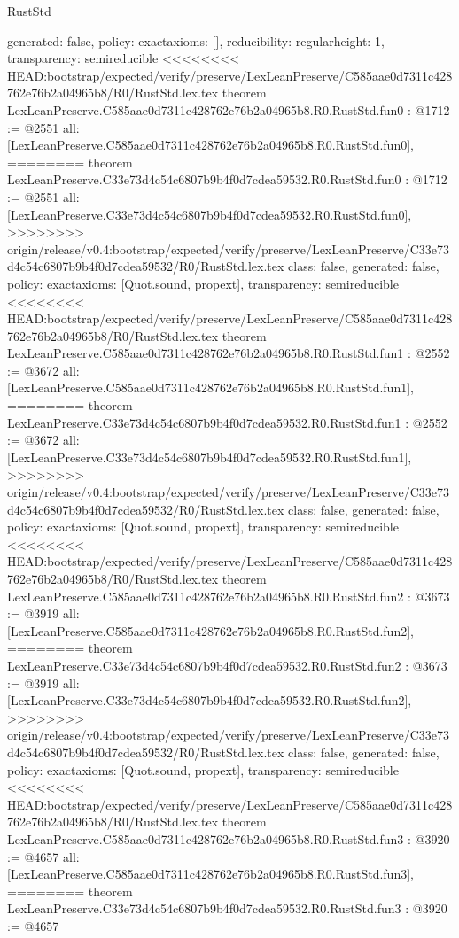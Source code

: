 \begin{lexlean}{RustStd}
\begin{coremodule}
{\begin{coremodule}
{{{  generated: false,
  policy: exact{axioms: []},
  reducibility: regular{height: 1},
  transparency: semireducible
}
<<<<<<<< HEAD:bootstrap/expected/verify/preserve/LexLeanPreserve/C585aae0d7311c428762e76b2a04965b8/R0/RustStd.lex.tex
theorem LexLeanPreserve.C585aae0d7311c428762e76b2a04965b8.R0.RustStd.fun0 : @1712 := @2551 {
  all: [LexLeanPreserve.C585aae0d7311c428762e76b2a04965b8.R0.RustStd.fun0],
========
theorem LexLeanPreserve.C33e73d4c54c6807b9b4f0d7cdea59532.R0.RustStd.fun0 : @1712 := @2551 {
  all: [LexLeanPreserve.C33e73d4c54c6807b9b4f0d7cdea59532.R0.RustStd.fun0],
>>>>>>>> origin/release/v0.4:bootstrap/expected/verify/preserve/LexLeanPreserve/C33e73d4c54c6807b9b4f0d7cdea59532/R0/RustStd.lex.tex
  class: false,
  generated: false,
  policy: exact{axioms: [Quot.sound, propext]},
  transparency: semireducible
}
<<<<<<<< HEAD:bootstrap/expected/verify/preserve/LexLeanPreserve/C585aae0d7311c428762e76b2a04965b8/R0/RustStd.lex.tex
theorem LexLeanPreserve.C585aae0d7311c428762e76b2a04965b8.R0.RustStd.fun1 : @2552 := @3672 {
  all: [LexLeanPreserve.C585aae0d7311c428762e76b2a04965b8.R0.RustStd.fun1],
========
theorem LexLeanPreserve.C33e73d4c54c6807b9b4f0d7cdea59532.R0.RustStd.fun1 : @2552 := @3672 {
  all: [LexLeanPreserve.C33e73d4c54c6807b9b4f0d7cdea59532.R0.RustStd.fun1],
>>>>>>>> origin/release/v0.4:bootstrap/expected/verify/preserve/LexLeanPreserve/C33e73d4c54c6807b9b4f0d7cdea59532/R0/RustStd.lex.tex
  class: false,
  generated: false,
  policy: exact{axioms: [Quot.sound, propext]},
  transparency: semireducible
}
<<<<<<<< HEAD:bootstrap/expected/verify/preserve/LexLeanPreserve/C585aae0d7311c428762e76b2a04965b8/R0/RustStd.lex.tex
theorem LexLeanPreserve.C585aae0d7311c428762e76b2a04965b8.R0.RustStd.fun2 : @3673 := @3919 {
  all: [LexLeanPreserve.C585aae0d7311c428762e76b2a04965b8.R0.RustStd.fun2],
========
theorem LexLeanPreserve.C33e73d4c54c6807b9b4f0d7cdea59532.R0.RustStd.fun2 : @3673 := @3919 {
  all: [LexLeanPreserve.C33e73d4c54c6807b9b4f0d7cdea59532.R0.RustStd.fun2],
>>>>>>>> origin/release/v0.4:bootstrap/expected/verify/preserve/LexLeanPreserve/C33e73d4c54c6807b9b4f0d7cdea59532/R0/RustStd.lex.tex
  class: false,
  generated: false,
  policy: exact{axioms: [Quot.sound, propext]},
  transparency: semireducible
}
<<<<<<<< HEAD:bootstrap/expected/verify/preserve/LexLeanPreserve/C585aae0d7311c428762e76b2a04965b8/R0/RustStd.lex.tex
theorem LexLeanPreserve.C585aae0d7311c428762e76b2a04965b8.R0.RustStd.fun3 : @3920 := @4657 {
  all: [LexLeanPreserve.C585aae0d7311c428762e76b2a04965b8.R0.RustStd.fun3],
========
theorem LexLeanPreserve.C33e73d4c54c6807b9b4f0d7cdea59532.R0.RustStd.fun3 : @3920 := @4657 {
}}}}}}}
\end{coremodule}}
\end{coremodule}
\end{lexlean}
